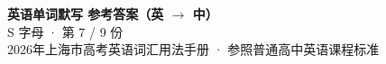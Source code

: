 \documentclass[10pt,a4paper]{article}
\begin{document}
\pagestyle{plain}

\begin{center}
{\LARGE\bfseries 英语单词默写 \quad 参考答案（英 $\to$ 中）}\\[0.22em]
{\large S 字母 · 第 7 / 9 份}\\[0.18em]
{\small 2026年上海市高考英语词汇用法手册 · 参照普通高中英语课程标准}
\end{center}

\vspace{0.2em}
\noindent{\color{rulegray}\rule{\textwidth}{0.8pt}}

\vspace{0.35em}

\vspace{0.25em}
\renewcommand{\arraystretch}{1.32}
\end{document}
